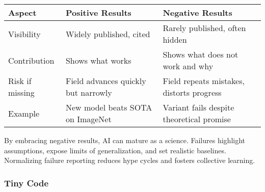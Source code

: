 \documentclass[
  letterpaper,
  DIV=11,
  numbers=noendperiod]{scrreprt}
\begin{document}
\begin{longtable}[]{@{}
  >{\raggedright\arraybackslash}p{}
  >{\raggedright\arraybackslash}p{}
  >{\raggedright\arraybackslash}p{}@{}}
\toprule\noalign{}
\begin{minipage}[b]{\linewidth}\raggedright
Aspect
\end{minipage} & \begin{minipage}[b]{\linewidth}\raggedright
Positive Results
\end{minipage} & \begin{minipage}[b]{\linewidth}\raggedright
Negative Results
\end{minipage} \\
\midrule\noalign{}
\endhead
\bottomrule\noalign{}
\endlastfoot
Visibility & Widely published, cited & Rarely published, often hidden \\
Contribution & Shows what works & Shows what does not work and why \\
Risk if missing & Field advances quickly but narrowly & Field repeats
mistakes, distorts progress \\
Example & New model beats SOTA on ImageNet & Variant fails despite
theoretical promise \\
\end{longtable}

By embracing negative results, AI can mature as a science. Failures
highlight assumptions, expose limits of generalization, and set
realistic baselines. Normalizing failure reporting reduces hype cycles
and fosters collective learning.

\subsubsection{Tiny Code}\label{tiny-code-96}
\end{document}
